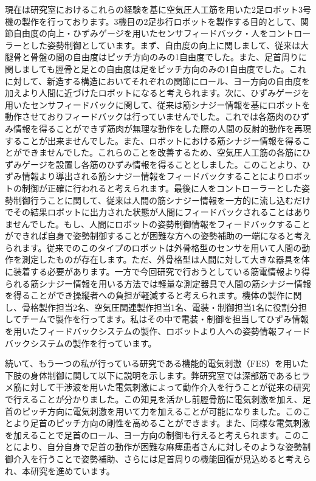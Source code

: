 \documentclass[a4paper,twocolumn]{jsarticle}
\begin{document}
    現在は研究室におけるこれらの経験を基に空気圧人工筋を用いた2足ロボット3号機の製作を行っております。3機目の2足歩行ロボットを製作する目的として、関節自由度の向上・ひずみゲージを用いたセンサフィードバック・人をコントローラーとした姿勢制御としています。まず、自由度の向上に関しまして、従来は大腿骨と骨盤の間の自由度はピッチ方向のみの1自由度でした。また、足首周りに関しましても脛骨と足との自由度は足をピッチ方向のみの1自由度でした。これに対して、新造する構造においてそれぞれの関節にロール、ヨー方向の自由度を加えより人間に近づけたロボットになると考えられます。次に、ひずみゲージを用いたセンサフィードバックに関して、従来は筋シナジー情報を基にロボットを動作させておりフィードバックは行っていませんでした。これでは各筋肉のひずみ情報を得ることができず筋肉が無理な動作をした際の人間の反射的動作を再現することが出来ませんでした。また、ロボットにおける筋シナジー情報を得ることができませんでした。これらのことを改善するため、空気圧人工筋の各筋にひずみゲージを設置し各筋のひずみ情報を得ることとしました。このことより、ひずみ情報より導出される筋シナジー情報をフィードバックすることによりロボットの制御が正確に行われると考えられます。最後に人をコントローラーとした姿勢制御行うことに関して、従来は人間の筋シナジー情報を一方的に流し込むだけでその結果ロボットに出力された状態が人間にフィードバックされることはありませんでした。もし、人間にロボットの姿勢制御情報をフィードバックすることができれば自身で姿勢制御することが困難な方への姿勢補助の一端になると考えられます。従来でのこのタイプのロボットは外骨格型のセンサを用いて人間の動作を測定したものが存在します。ただ、外骨格型は人間に対して大きな器具を体に装着する必要があります。一方で今回研究で行おうとしている筋電情報より得られる筋シナジー情報を用いる方法では軽量な測定器具で人間の筋シナジー情報を得ることができ操縦者への負担が軽減すると考えられます。機体の製作に関し、骨格製作担当2名、空気圧関連製作担当1名、電装・制御担当1名に役割分担してチームで製作を行ってます。私はその中で電装・制御を担当してひずみ情報を用いたフィードバックシステムの製作、ロボットより人への姿勢情報フィードバックシステムの製作を行っています。

    続いて、もう一つの私が行っている研究である機能的電気刺激（FES）を用いた下肢の身体制御に関して以下に説明を示します。弊研究室では深部筋であるヒラメ筋に対して干渉波を用いた電気刺激によって動作介入を行うことが従来の研究で行えることが分かりました。この知見を活かし前脛骨筋に電気刺激を加え、足首のピッチ方向に電気刺激を用いて力を加えることが可能になりました。このことより足首のピッチ方向の剛性を高めることができます。また、同様な電気刺激を加えることで足首のロール、ヨー方向の制御も行えると考えられます。このことにより、自分自身で足首の動作が困難な麻痺患者さんに対しそのような姿勢制御介入を行うことで姿勢補助、さらには足首周りの機能回復が見込めると考えられ、本研究を進めています。
\end{document}
